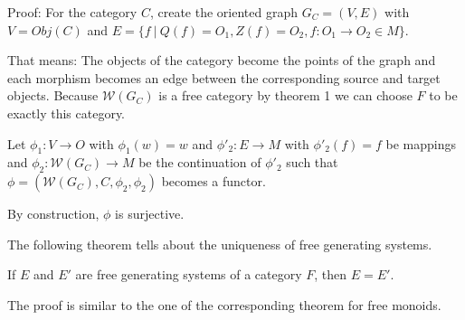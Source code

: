 Proof: For the category $C$, create the oriented graph $G_C = (V, E)$ with $V =
Obj(C)$ and $E = \{ f\ |\ Q(f) = O_1, Z(f) = O_2, f : O_1 \to O_2 \in M \}$.

That means: The objects of the category become the points of the graph and each
morphism becomes an edge between the corresponding source and target objects.
Because $\mathcal{W}(G_C)$ is a free category by theorem 1 we can choose $F$ to
be exactly this category.

Let $\phi_1 : V \to O$ with $\phi_1(w) = w$ and $\phi'_2 : E \to M$ with
$\phi'_2(f) = f$ be mappings and $\phi_2 : \mathcal{W}(G_C) \to M$ be the
continuation of $\phi'_2$ such that $\phi = (\mathcal{W}(G_C), C, \phi_2,
\phi_2)$ becomes a functor.

By construction, $\phi$ is surjective.

The following theorem tells about the uniqueness of free generating systems.

\begin{theorem}
If $E$ and $E'$ are free generating systems of a category $F$, then $E = E'$.
\end{theorem}

The proof is similar to the one of the corresponding theorem for free monoids.
